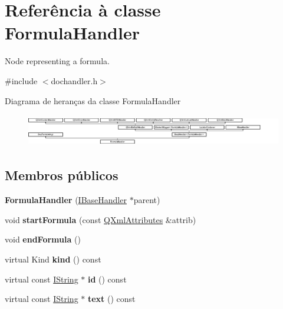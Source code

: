 \hypertarget{class_formula_handler}{\section{Referência à classe Formula\-Handler}
\label{class_formula_handler}
}


Node representing a formula.  




{\ttfamily \#include $<$dochandler.\-h$>$}

Diagrama de heranças da classe Formula\-Handler\begin{figure}[H]
\begin{center}
\leavevmode
\includegraphics[height=1.434978cm]{class_formula_handler}
\end{center}
\end{figure}
\subsection*{Membros públicos}
\begin{DoxyCompactItemize}
\item 
\hypertarget{class_formula_handler_acc774237d14f4aa8f2d4b3b10b831ffd}{{\bfseries Formula\-Handler} (\hyperlink{class_i_base_handler}{I\-Base\-Handler} $\ast$parent)}\label{class_formula_handler_acc774237d14f4aa8f2d4b3b10b831ffd}

\item 
\hypertarget{class_formula_handler_a26fc2208b8728045a78a977ae9e1961c}{void {\bfseries start\-Formula} (const \hyperlink{class_q_xml_attributes}{Q\-Xml\-Attributes} \&attrib)}\label{class_formula_handler_a26fc2208b8728045a78a977ae9e1961c}

\item 
\hypertarget{class_formula_handler_a7f6afdcd4e783a74f497291d72538152}{void {\bfseries end\-Formula} ()}\label{class_formula_handler_a7f6afdcd4e783a74f497291d72538152}

\item 
\hypertarget{class_formula_handler_af8e62c8a81ddf2283205cc8955de50eb}{virtual Kind {\bfseries kind} () const }\label{class_formula_handler_af8e62c8a81ddf2283205cc8955de50eb}

\item 
\hypertarget{class_formula_handler_acf656d73faffcdf0382f68eb78869cf4}{virtual const \hyperlink{class_i_string}{I\-String} $\ast$ {\bfseries id} () const }\label{class_formula_handler_acf656d73faffcdf0382f68eb78869cf4}

\item 
\hypertarget{class_formula_handler_a38ed11cab67ca9bf8d04302e53b86a69}{virtual const \hyperlink{class_i_string}{I\-String} $\ast$ {\bfseries text} () const }\label{class_formula_handler_a38ed11cab67ca9bf8d04302e53b86a69}

\end{DoxyCompactItemize}
